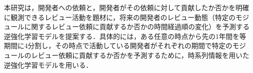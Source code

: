 \documentclass[submit,noauthor,ses,dvipdfmx]{ipsj}
\newcommand{\todo}[1]{\colorbox{yellow}{{\bf TODO}:}{\color{red} {\textbf{[#1]}}}}
\newcommand{\fixstart}{\color{magenta}}
\newcommand{\fixend}{\color{black}}
\begin{document}
本研究は，開発者への依頼と，開発者がその依頼に対して貢献したか否かを明確に観測できるレビュー活動を題材に，将来の開発者のレビュー動態（特定のモジュールに関するレビュー依頼に貢献するか否かの時間経過順の変化）を予測する逆強化学習モデルを提案する．\fixstart 具体的には，ある任意の時点から先の1年間を等期間に4分割し，その時点で活動している開発者がそれぞれの期間で特定のモジュールのレビュー依頼に貢献するか否かを予測するために，時系列情報を用いた逆強化学習モデルを用いる．\fixend






\end{document}
